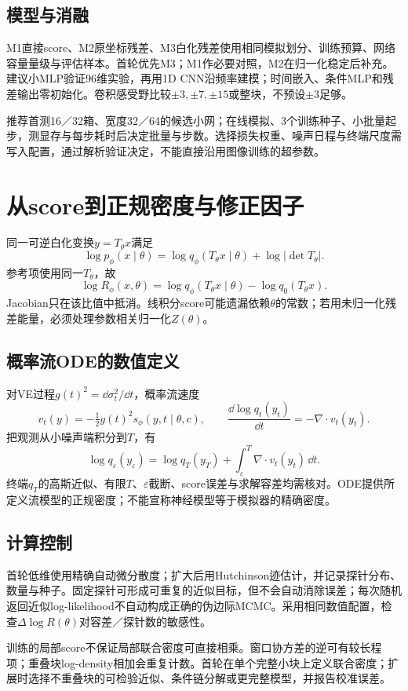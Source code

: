 \documentclass[UTF8,fontset=none,a4paper,11pt]{ctexart}
\begin{document}
\subsection{模型与消融}
M1直接score、M2原坐标残差、M3白化残差使用相同模拟划分、训练预算、网络容量量级与评估样本。首轮优先M3；M1作必要对照，M2在归一化稳定后补充。建议小MLP验证96维实验，再用1D CNN沿频率建模；时间嵌入、条件MLP和残差输出零初始化。卷积感受野比较$\pm3,\pm7,\pm15$或整块，不预设$\pm3$足够。

推荐首测16／32箱、宽度32／64的候选小网；在线模拟、3个训练种子、小批量起步，测显存与每步耗时后决定批量与步数。选择损失权重、噪声日程与终端尺度需写入配置，通过解析验证决定，不能直接沿用图像训练的超参数。
\clearpage

\section{从score到正规密度与修正因子}
同一可逆白化变换$y=T_\theta x$满足
\[
\log p_\phi(x\mid\theta)=\log q_\phi(T_\theta x\mid\theta)
 +\log|\det T_\theta|.
\]
参考项使用同一$T_\theta$，故
\[
\boxed{\log R_\phi(x,\theta)=\log q_\phi(T_\theta x\mid\theta)
 -\log q_0(T_\theta x).}
\]
Jacobian只在该比值中抵消。线积分score可能遗漏依赖$\theta$的常数；若用未归一化残差能量，必须处理参数相关归一化$Z(\theta)$。
\subsection{概率流ODE的数值定义}
对VE过程$g(t)^2=\dd\sigma_t^2/\dd t$，概率流速度
\[
v_t(y)=-\tfrac12g(t)^2s_\phi(y,t\mid\theta,c),\qquad
\frac{\dd\log q_t(y_t)}{\dd t}=-\nabla\cdot v_t(y_t).
\]
把观测从小噪声端积分到$T$，有
\[
\log q_{\varepsilon}(y_\varepsilon)=\log q_T(y_T)
+\int_{\varepsilon}^{T}\nabla\cdot v_t(y_t)\,\dd t.
\]
终端$q_T$的高斯近似、有限$T$、$\varepsilon$截断、score误差与求解容差均需核对。ODE提供所定义流模型的正规密度；不能宣称神经模型等于模拟器的精确密度。
\subsection{计算控制}
首轮低维使用精确自动微分散度；扩大后用Hutchinson迹估计，并记录探针分布、数量与种子。固定探针可形成可重复的近似目标，但不会自动消除误差；每次随机返回近似log-likelihood不自动构成正确的伪边际MCMC。采用相同数值配置，检查$\Delta\log R(\theta)$对容差／探针数的敏感性。

训练的局部score不保证局部联合密度可直接相乘。窗口协方差的逆可有较长程项；重叠块log-density相加会重复计数。首轮在单个完整小块上定义联合密度；扩展时选择不重叠块的可检验近似、条件链分解或更完整模型，并报告校准误差。
\clearpage
\end{document}
